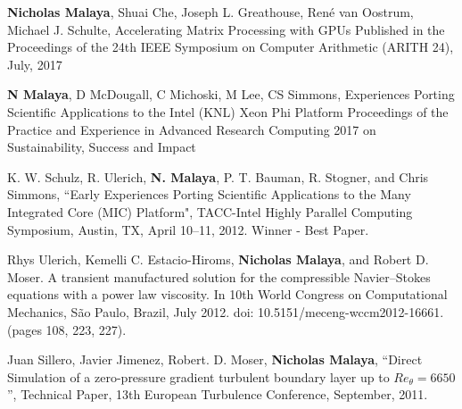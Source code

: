 \textbf{Nicholas Malaya}, Shuai Che, Joseph L. Greathouse, René van Oostrum,
Michael J. Schulte, Accelerating Matrix Processing with GPUs
Published in the Proceedings of the 24th IEEE Symposium on Computer
Arithmetic (ARITH 24), July, 2017 

\blankline

\textbf{N Malaya}, D McDougall, C Michoski, M Lee, CS Simmons,
Experiences Porting Scientific Applications to the Intel (KNL) Xeon Phi Platform
Proceedings of the Practice and Experience in Advanced Research Computing
2017 on Sustainability, Success and Impact

\blankline

K. W. Schulz,  R. Ulerich,  \textbf{N. Malaya}, P. T. Bauman, R. Stogner, and Chris Simmons,
``Early Experiences Porting Scientific Applications to the Many Integrated Core (MIC) Platform",
TACC-Intel Highly Parallel Computing Symposium, Austin, TX,
April 10--11, 2012. Winner - Best Paper.

\blankline

Rhys Ulerich, Kemelli C. Estacio-Hiroms, \textbf{Nicholas Malaya}, and Robert D. Moser.
A transient manufactured solution for the compressible Navier–Stokes equations
with a power law viscosity. In 10th World Congress on Computational Mechanics,
São Paulo, Brazil, July 2012. doi: 10.5151/meceng-wccm2012-16661. (pages
108, 223, 227).

\blankline

Juan Sillero, Javier Jimenez, Robert. D. Moser, \textbf{Nicholas Malaya},
``Direct Simulation of a zero-pressure gradient turbulent boundary layer
up to $Re_{\theta}=6650$'', Technical Paper, 13th European Turbulence
Conference, September, 2011.
